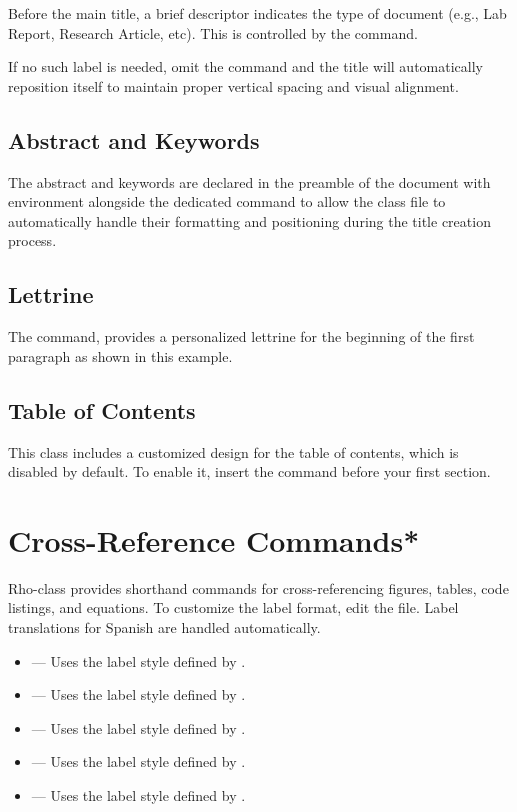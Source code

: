 \documentclass[9pt,a4paper,twocolumn,twoside]{rho-class/rho}
\begin{document}
        Before the main title, a brief descriptor indicates the type of document (e.g., Lab Report, Research Article, etc). This is controlled by the \inlinecode{\doctype{}} command. 
        
        If no such label is needed, omit the command and the title will automatically reposition itself to maintain proper vertical spacing and visual alignment.

    \subsection{Abstract and Keywords}

        The abstract and keywords are declared in the preamble of the document with  environment alongside the dedicated \inlinecode{\keywords{}} command to allow the class file to automatically handle their formatting and positioning during the title creation process.

    \subsection{Lettrine}

		The \inlinecode{\rhostart{}} command, provides a personalized lettrine for the beginning of the first paragraph as shown in this example.

	\subsection{Table of Contents}

        This class includes a customized design for the table of contents, which is disabled by default. To enable it, insert the \inlinecode{\tableofcontents} command before your first section.

\section{Cross-Reference Commands*}

    Rho-class provides shorthand commands for cross-referencing figures, tables, code listings, and equations. To customize the label format, edit the  file. Label translations for Spanish are handled automatically.

        \begin{itemize}
            \item \inlinecode{\figref{}} — Uses the label style defined by \inlinecode{\figlabel}.
            \item \inlinecode{\figsref{}} — Uses the label style defined by \inlinecode{\figslabel}.
            \item \inlinecode{\tabref{}} — Uses the label style defined by \inlinecode{\tablabel}.
            \item \inlinecode{\coderef{}}  — Uses the label style defined by \inlinecode{\captionlabelcode}.
            \item \inlinecode{\equref{}} — Uses the label style defined by \inlinecode{\eqlabel}.
        \end{itemize}
        
\end{document}
